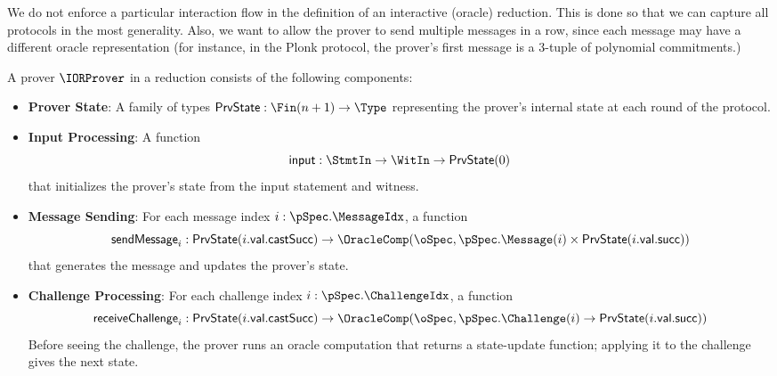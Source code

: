 \begin{remark}
    We do not enforce a particular interaction flow in the definition of an interactive (oracle) reduction. This is done so that we can capture all protocols in the most generality. Also, we want to allow the prover to send multiple messages in a row, since each message may have a different oracle representation (for instance, in the Plonk protocol, the prover's first message is a 3-tuple of polynomial commitments.)
\end{remark}

\begin{definition}
    \label{def:prover}
    A prover \(\IORProver\) in a reduction consists of the following components:

    \begin{itemize}
        \item \textbf{Prover State}: A family of types \(\mathsf{PrvState} : \Fin(n+1) \to \Type\) representing the prover's internal state at each round of the protocol.

        \item \textbf{Input Processing}: A function
        \begin{equation*} \mathsf{input} : \StmtIn \to \WitIn \to \mathsf{PrvState}(0) \end{equation*}
        that initializes the prover's state from the input statement and witness.

        \item \textbf{Message Sending}: For each message index \(i : \pSpec.\MessageIdx\), a function
        \begin{equation*} \mathsf{sendMessage}_i : \mathsf{PrvState}(i.\mathsf{val}.\mathsf{castSucc}) \to \OracleComp(\oSpec, \pSpec.\Message(i) \times \mathsf{PrvState}(i.\mathsf{val}.\mathsf{succ})) \end{equation*}
        that generates the message and updates the prover's state.

        \item \textbf{Challenge Processing}: For each challenge index \(i : \pSpec.\ChallengeIdx\), a function
        \begin{equation*} \mathsf{receiveChallenge}_i : \mathsf{PrvState}(i.\mathsf{val}.\mathsf{castSucc}) \to \OracleComp(\oSpec, \pSpec.\Challenge(i) \to \mathsf{PrvState}(i.\mathsf{val}.\mathsf{succ})) \end{equation*}
        Before seeing the challenge, the prover runs an oracle computation that returns a
        state-update function; applying it to the challenge gives the next state.


\end{itemize}
\end{definition}
